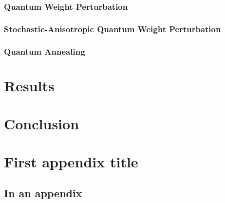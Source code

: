 \documentclass[11pt]{afthesis}
\begin{document}
	\subsection{Quantum Weight Perturbation}
	
	
	
	
	\subsection{Stochastic-Anisotropic Quantum Weight Perturbation}
	
	
	
	\subsection{Quantum Annealing}
	
	
	
	
	
	
	\chapter{Results}
	
	\chapter{Conclusion}
	
	
	\appendix		%
	
	\chapter{First appendix title}
	
	\section{In an appendix} 
	
\end{document}
